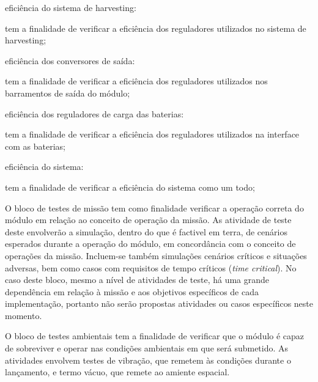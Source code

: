 \begin{alineas}
    \item eficiência do sistema de harvesting:
    \begin{alineas}
        \item tem a finalidade de verificar a eficiência dos reguladores utilizados no sistema de harvesting;
    \end{alineas}

    \item eficiência dos conversores de saída:
    \begin{alineas}
        \item tem a finalidade de verificar a eficiência dos reguladores utilizados nos barramentos de saída do módulo;
    \end{alineas}

    \item eficiência dos reguladores de carga das baterias:
    \begin{alineas}
        \item tem a finalidade de verificar a eficiência dos reguladores utilizados na interface com as baterias;
    \end{alineas}

    \item eficiência do sistema:
    \begin{alineas}
        \item tem a finalidade de verificar a eficiência do sistema como um todo;
    \end{alineas}

\end{alineas}


O bloco de testes de missão tem como finalidade verificar a operação correta do módulo em relação ao conceito de operação da missão.
As atividade de teste deste envolverão a simulação, dentro do que é factivel em terra, de cenários esperados durante a operação do módulo, em concordância com o conceito de operações da missão.
Incluem-se também simulações cenários críticos e situações adversas, bem como casos com requisitos de tempo críticos (\textit{time critical}).
No caso deste bloco, mesmo a nível de atividades de teste, há uma grande dependência em relação à missão e aos objetivos específicos de cada implementação, portanto não serão propostas atividades ou casos específicos neste momento.

O bloco de testes ambientais tem a finalidade de verificar que o módulo é capaz de sobreviver e operar nas condições ambientais em que será submetido.
As atividades envolvem testes de vibração, que remetem às condições durante o lançamento, e termo vácuo, que remete ao amiente espacial.


